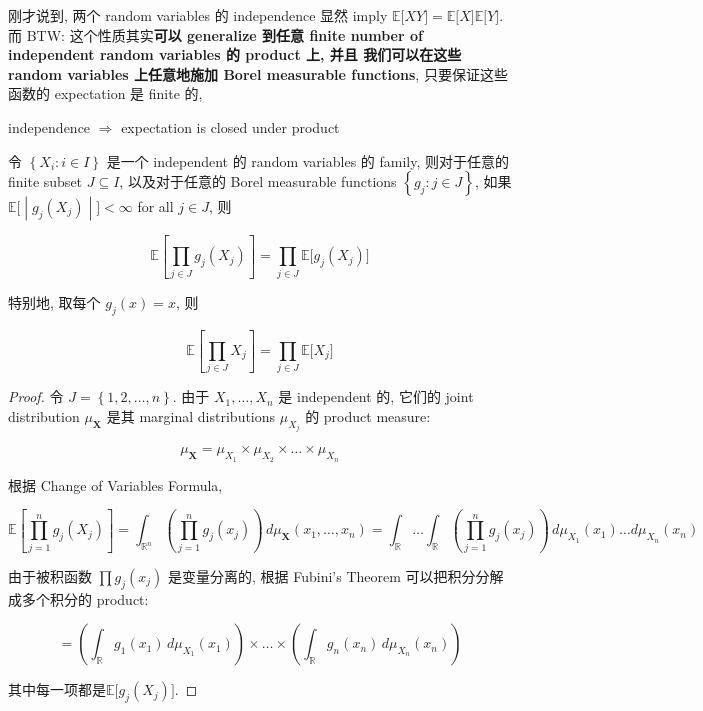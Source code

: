 \documentclass{qlnotes-export}
\begin{document}
刚才说到, 两个 random variables 的 independence 显然 imply \({\mathbb{E}}\lbrack XY\rbrack = {\mathbb{E}}\lbrack X\rbrack{\mathbb{E}}\lbrack Y\rbrack\). 而 BTW: 这个性质其实\textbf{可以 generalize 到任意 finite number of independent random variables 的 product 上, 并且 我们可以在这些 random variables 上任意地施加 Borel measurable functions}, 只要保证这些函数的 expectation 是 finite 的,

\begin{theorem}{independence \(\Longrightarrow\) expectation is closed under product}\label{thm-03-joint-conditional-distribution-independence-implies-expectation-is-closed-under-product}

令 \(\left\{ {X_{i}:i \in I} \right\}\) 是一个 independent 的 random variables 的 family, 则对于任意的 finite subset \(J \subseteq I\), 以及对于任意的 Borel measurable functions \(\left\{ {g_{j}:j \in J} \right\}\), 如果 \(\left. {\mathbb{E}}\lbrack \middle| g_{j}(X_{j}) \middle| \rbrack < \infty \right.\) for all \(j \in J\), 则

\[{\mathbb{E}}\left\lbrack {\prod\limits_{j \in J}g_{j}(X_{j})} \right\rbrack = \prod\limits_{j \in J}{\mathbb{E}}\lbrack g_{j}(X_{j})\rbrack\]

特别地, 取每个 \(g_{j}(x) = x\), 则

\[{\mathbb{E}}\left\lbrack {\prod\limits_{j \in J}X_{j}} \right\rbrack = \prod\limits_{j \in J}{\mathbb{E}}\lbrack X_{j}\rbrack\]

\end{theorem}

\begin{proof}

令 \(J = \left\{ {1,2,\ldots,n} \right\}\). 由于 \(X_{1},\ldots,X_{n}\) 是 independent 的, 它们的 joint distribution \(\mu_{\mathbf{X}}\) 是其 marginal distributions \(\mu_{X_{j}}\) 的 product measure:

\[\mu_{\mathbf{X}} = \mu_{X_{1}} \times \mu_{X_{2}} \times \ldots \times \mu_{X_{n}}\]

根据 Change of Variables Formula,

\[{\mathbb{E}}\left\lbrack {\prod\limits_{j = 1}^{n}g_{j}(X_{j})} \right\rbrack = \int_{{\mathbb{R}}^{n}}\left( {\prod\limits_{j = 1}^{n}g_{j}(x_{j})} \right)\, d\mu_{\mathbf{X}}(x_{1},\ldots,x_{n}) = \int_{\mathbb{R}}\ldots\int_{\mathbb{R}}\left( {\prod\limits_{j = 1}^{n}g_{j}(x_{j})} \right)\, d\mu_{X_{1}}(x_{1})\ldots d\mu_{X_{n}}(x_{n})\]

由于被积函数 \(\prod g_{j}(x_{j})\) 是变量分离的, 根据 Fubini's Theorem 可以把积分分解成多个积分的 product:

\[= \left( {\int_{\mathbb{R}}g_{1}(x_{1})\, d\mu_{X_{1}}(x_{1})} \right) \times \ldots \times \left( {\int_{\mathbb{R}}g_{n}(x_{n})\, d\mu_{X_{n}}(x_{n})} \right)\]

其中每一项都是\({\mathbb{E}}\lbrack g_{j}(X_{j})\rbrack\).

\end{proof}
\end{document}
